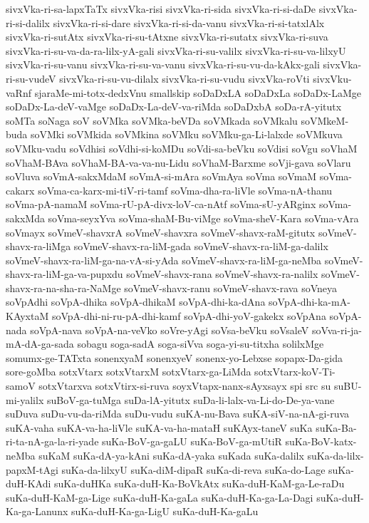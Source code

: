 {sivxVka-ri-sa-lapxTaTx
sivxVka-risi
sivxVka-ri-sida
sivxVka-ri-si-daDe
sivxVka-ri-si-dalilx
sivxVka-ri-si-dare
sivxVka-ri-si-da-vanu
sivxVka-ri-si-tatxlAlx
sivxVka-ri-sutAtx
sivxVka-ri-su-tAtxne
sivxVka-ri-sutatx
sivxVka-ri-suva
sivxVka-ri-su-va-da-ra-lilx-yA-gali
sivxVka-ri-su-valilx
sivxVka-ri-su-va-lilxyU
sivxVka-ri-su-vanu
sivxVka-ri-su-va-vanu
sivxVka-ri-su-vu-da-kAkx-gali
sivxVka-ri-su-vudeV
sivxVka-ri-su-vu-dilalx
sivxVka-ri-su-vudu
sivxVka-roVti
sivxVku-vaRnf
sjaraMe-mi-totx-dedxVnu
smallskip
soDaDxLA
soDaDxLa
soDaDx-LaMge
soDaDx-La-deV-vaMge
soDaDx-La-deV-va-riMda
soDaDxbA
soDa-rA-yitutx
soMTa
soNaga
soV
soVMka
soVMka-beVDa
soVMkada
soVMkalu
soVMkeM-buda
soVMki
soVMkida
soVMkina
soVMku
soVMku-ga-Li-lalxde
soVMkuva
soVMku-vadu
soVdhisi
soVdhi-si-koMDu
soVdi-sa-beVku
soVdisi
soVgu
soVhaM
soVhaM-BAva
soVhaM-BA-va-va-nu-Lidu
soVhaM-Barxme
soVji-gava
soVlaru
soVluva
soVmA-sakxMdaM
soVmA-si-mAra
soVmAya
soVma
soVmaM
soVma-cakarx
soVma-ca-karx-mi-tiV-ri-tamf
soVma-dha-ra-liVle
soVma-nA-thanu
soVma-pA-namaM
soVma-rU-pA-divx-loV-ca-nAtf
soVma-sU-yARginx
soVma-sakxMda
soVma-seyxYva
soVma-shaM-Bu-viMge
soVma-sheV-Kara
soVma-vAra
soVmayx
soVmeV-shavxrA
soVmeV-shavxra
soVmeV-shavx-raM-gitutx
soVmeV-shavx-ra-liMga
soVmeV-shavx-ra-liM-gada
soVmeV-shavx-ra-liM-ga-dalilx
soVmeV-shavx-ra-liM-ga-na-vA-si-yAda
soVmeV-shavx-ra-liM-ga-neMba
soVmeV-shavx-ra-liM-ga-va-pupxdu
soVmeV-shavx-rana
soVmeV-shavx-ra-nalilx
soVmeV-shavx-ra-na-sha-ra-NaMge
soVmeV-shavx-ranu
soVmeV-shavx-rava
soVneya
soVpAdhi
soVpA-dhika
soVpA-dhikaM
soVpA-dhi-ka-dAna
soVpA-dhi-ka-mA-KAyxtaM
soVpA-dhi-ni-ru-pA-dhi-kamf
soVpA-dhi-yoV-gakekx
soVpAna
soVpA-nada
soVpA-nava
soVpA-na-veVko
soVre-yAgi
soVsa-beVku
soVsaleV
soVva-ri-ja-mA-dA-ga-sada
sobagu
soga-sadA
soga-siVva
soga-yi-su-titxha
solilxMge
somumx-ge-TATxta
sonenxyaM
sonenxyeV
sonenx-yo-Lebxse
sopapx-Da-gida
sore-goMba
sotxVtarx
sotxVtarxM
sotxVtarx-ga-LiMda
sotxVtarx-koV-Ti-samoV
sotxVtarxva
sotxVtirx-si-ruva
soyxVtapx-nanx-sAyxsayx
spi
src
su
suBU-mi-yalilx
suBoV-ga-tuMga
suDa-lA-yitutx
suDa-li-lalx-va-Li-do-De-ya-vane
suDuva
suDu-vu-da-riMda
suDu-vudu
suKA-nu-Bava
suKA-siV-na-nA-gi-ruva
suKA-vaha
suKA-va-ha-liVle
suKA-va-ha-mataH
suKAyx-taneV
suKa
suKa-Ba-ri-ta-nA-ga-la-ri-yade
suKa-BoV-ga-gaLU
suKa-BoV-ga-mUtiR
suKa-BoV-katx-neMba
suKaM
suKa-dA-ya-kAni
suKa-dA-yaka
suKada
suKa-dalilx
suKa-da-lilx-papxM-tAgi
suKa-da-lilxyU
suKa-diM-dipaR
suKa-di-reva
suKa-do-Lage
suKa-duH-KAdi
suKa-duHKa
suKa-duH-Ka-BoVkAtx
suKa-duH-KaM-ga-Le-raDu
suKa-duH-KaM-ga-Lige
suKa-duH-Ka-gaLa
suKa-duH-Ka-ga-La-Dagi
suKa-duH-Ka-ga-Lanunx
suKa-duH-Ka-ga-LigU
suKa-duH-Ka-gaLu
}
